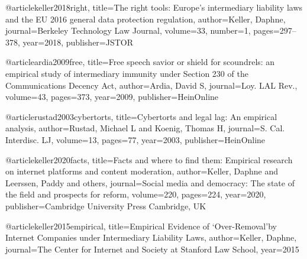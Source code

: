 @article{keller2018right,
  title={The right tools: Europe’s intermediary liability laws and the EU 2016 general data protection regulation},
  author={Keller, Daphne},
  journal={Berkeley Technology Law Journal},
  volume={33},
  number={1},
  pages={297--378},
  year={2018},
  publisher={JSTOR}
}


@article{ardia2009free,
  title={Free speech savior or shield for scoundrels: an empirical study of intermediary immunity under Section 230 of the Communications Decency Act},
  author={Ardia, David S},
  journal={Loy. LAL Rev.},
  volume={43},
  pages={373},
  year={2009},
  publisher={HeinOnline}
}


@article{rustad2003cybertorts,
  title={Cybertorts and legal lag: An empirical analysis},
  author={Rustad, Michael L and Koenig, Thomas H},
  journal={S. Cal. Interdisc. LJ},
  volume={13},
  pages={77},
  year={2003},
  publisher={HeinOnline}
}

@article{keller2020facts,
  title={Facts and where to find them: Empirical research on internet platforms and content moderation},
  author={Keller, Daphne and Leerssen, Paddy and others},
  journal={Social media and democracy: The state of the field and prospects for reform},
  volume={220},
  pages={224},
  year={2020},
  publisher={Cambridge University Press Cambridge, UK}
}

@article{keller2015empirical,
  title={Empirical Evidence of ‘Over-Removal’by Internet Companies under Intermediary Liability Laws},
  author={Keller, Daphne},
  journal={The Center for Internet and Society at Stanford Law School},
  year={2015}
}